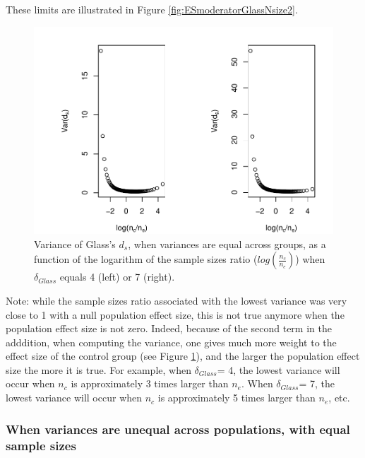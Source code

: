 \documentclass[
  english,
  man]{apa6}
\begin{document}
These limits are illustrated in Figure \ref{fig:ESmoderatorGlassNsize2}.

\begin{figure}
\centering
\includegraphics{Theoretical-Variance-of-all-estimators-as-a-function-of-population-parameters_files/figure-latex/varglasshomNratiobis2-1.pdf}
\caption{\label{fig:varglasshomNratiobis2}Variance of Glass's \(d_s\), when variances are equal across groups, as a function of the logarithm of the sample sizes ratio (\(log\left(\frac{n_c}{n_e} \right)\)) when \(\delta_{Glass}\) equals 4 (left) or 7 (right).}
\end{figure}

Note: while the sample sizes ratio associated with the lowest variance was very close to 1 with a null population effect size, this is not true anymore when the population effect size is not zero. Indeed, because of the second term in the adddition, when computing the variance, one gives much more weight to the effect size of the control group (see Figure \ref{fig:varglasshomNratiobis2}), and the larger the population effect size the more it is true. For example, when \(\delta_{Glass}\)= 4, the lowest variance will occur when \(n_c\) is approximately 3 times larger than \(n_e\). When \(\delta_{Glass}\)= 7, the lowest variance will occur when \(n_c\) is approximately 5 times larger than \(n_e\), etc.

\hypertarget{when-variances-are-unequal-across-populations-with-equal-sample-sizes}{%
\subsubsection{When variances are unequal across populations, with equal sample sizes}\label{when-variances-are-unequal-across-populations-with-equal-sample-sizes}}
\end{document}
